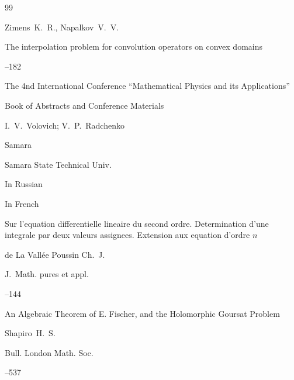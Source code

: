 \newpage



\EngRef





\begin{thebibliography}{99}




\by Zimens~K.~R., Napalkov~V.~V. 

\paper The interpolation problem for convolution operators on convex domains

--182

\inbook  The 4nd International Conference ``Mathematical Physics and its Applications''

\bookinfo Book of Abstracts and Conference Materials

\eds I.~V.~Volovich; V.~P.~Radchenko

\publaddr Samara

\publ Samara State Technical Univ.


\lang In Russian






\lang In French

\paper Sur l'equation differentielle lineaire du second ordre. Deter\-mi\-na\-tion d’une integrale par deux valeurs assignees. Extension aux equation d'ordre $n$

\by de La Vall\'ee Poussin Ch.~J.

\jour J.~Math. pures et appl.




--144





\paper An Algebraic Theorem of E. Fischer, and the Holomorphic Goursat Problem

\by Shapiro~H.~S.

\jour Bull. London Math. Soc.




--537


\end{thebibliography}

